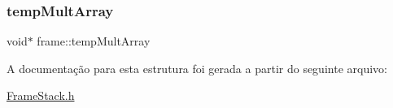 \mbox{\label{structframe_ae25d34f063809e9990a1279fa9a794f4}} 
\subsubsection{\texorpdfstring{temp\+Mult\+Array}{tempMultArray}}
{\footnotesize\ttfamily void$\ast$ frame\+::temp\+Mult\+Array}



A documentação para esta estrutura foi gerada a partir do seguinte arquivo\+:\begin{DoxyCompactItemize}
\item 
\hyperlink{FrameStack_8h}{Frame\+Stack.\+h}\end{DoxyCompactItemize}
